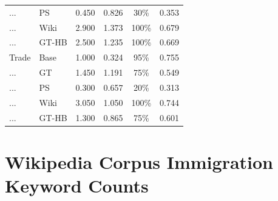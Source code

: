 \documentclass[12pt]{article}
\begin{document}
\begin{longtable}{llcccc}
    ...              & PS   & 0.450 & 0.826 & 30\% & 0.353 \\
    ...              & Wiki & 2.900 & 1.373 & 100\% & 0.679 \\
    ...              & GT-HB & 2.500 & 1.235 & 100\% & 0.669 \\
    \addlinespace
    Trade            & Base & 1.000 & 0.324 & 95\% & 0.755 \\
    ...              & GT   & 1.450 & 1.191 & 75\% & 0.549 \\
    ...              & PS   & 0.300 & 0.657 & 20\% & 0.313 \\
    ...              & Wiki & 3.050 & 1.050 & 100\% & 0.744 \\
    ...              & GT-HB & 1.300 & 0.865 & 75\% & 0.601 \\
\end{longtable}

\section{Wikipedia Corpus Immigration Keyword Counts}
\end{document}
